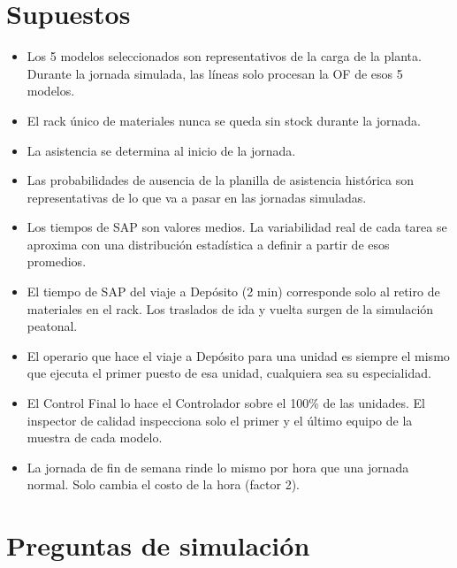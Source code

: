 \documentclass[11pt,a4paper]{article}
\begin{document}
\section{Supuestos}

\begin{itemize}
  \item Los 5 modelos seleccionados son representativos de la carga de la planta. Durante la jornada simulada, las líneas solo procesan la OF de esos 5 modelos.
  \item El rack único de materiales nunca se queda sin stock durante la jornada.
  \item La asistencia se determina al inicio de la jornada.
  \item Las probabilidades de ausencia de la planilla de asistencia histórica son representativas de lo que va a pasar en las jornadas simuladas.
  \item Los tiempos de SAP son valores medios. La variabilidad real de cada tarea se aproxima con una distribución estadística a definir a partir de esos promedios.
  \item El tiempo de SAP del viaje a Depósito (2 min) corresponde solo al retiro de materiales en el rack. Los traslados de ida y vuelta surgen de la simulación peatonal.
  \item El operario que hace el viaje a Depósito para una unidad es siempre el mismo que ejecuta el primer puesto de esa unidad, cualquiera sea su especialidad.
  \item El Control Final lo hace el Controlador sobre el 100\% de las unidades. El inspector de calidad inspecciona solo el primer y el último equipo de la muestra de cada modelo.
  \item La jornada de fin de semana rinde lo mismo por hora que una jornada normal. Solo cambia el costo de la hora (factor 2).
\end{itemize}

\section{Preguntas de simulación}
\end{document}
